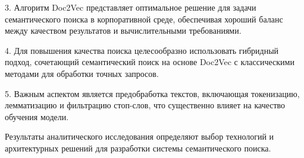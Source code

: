 	3. Алгоритм Doc2Vec представляет оптимальное решение для задачи семантического поиска в корпоративной среде, обеспечивая хороший баланс между качеством результатов и вычислительными требованиями.
	
	4. Для повышения качества поиска целесообразно использовать гибридный подход, сочетающий семантический поиск на основе Doc2Vec с классическими методами для обработки точных запросов.
	
	5. Важным аспектом является предобработка текстов, включающая токенизацию, лемматизацию и фильтрацию стоп-слов, что существенно влияет на качество обучения модели.
	
	Результаты аналитического исследования определяют выбор технологий и архитектурных решений для разработки системы семантического поиска.
	
\clearpage